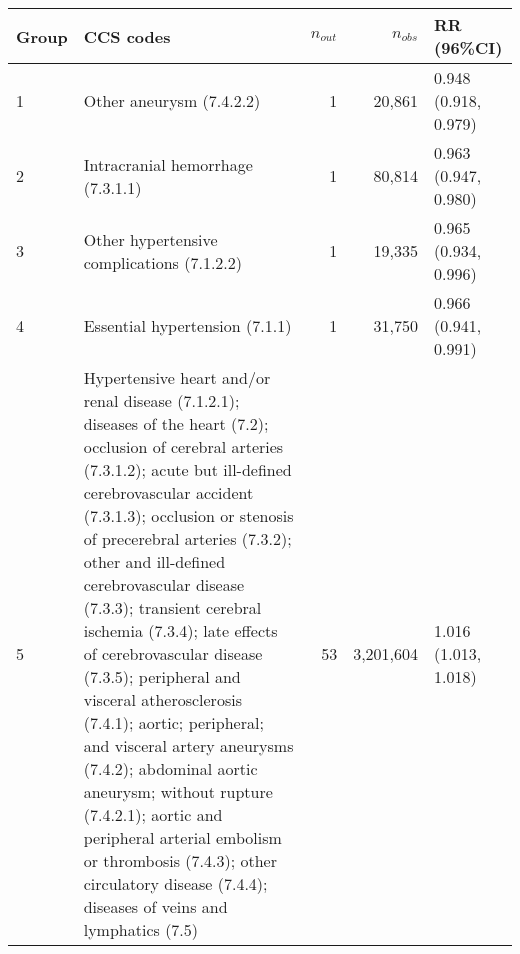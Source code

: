 \begin{tabular}{lp{6.5cm}rrp{2.2cm}}
  \hline
Group & CCS codes & $n_{out}$ & $n_{obs}$ & RR (96\%CI) \\ 
  \hline
   1 & Other aneurysm (7.4.2.2) &    1 & 20,861 & 0.948 (0.918, 0.979) \\ 
     2 & Intracranial hemorrhage (7.3.1.1) &    1 & 80,814 & 0.963 (0.947, 0.980) \\ 
     3 & Other hypertensive complications (7.1.2.2) &    1 & 19,335 & 0.965 (0.934, 0.996) \\ 
     4 & Essential hypertension (7.1.1) &    1 & 31,750 & 0.966 (0.941, 0.991) \\ 
     5 & Hypertensive heart and/or renal disease (7.1.2.1); diseases of the heart (7.2); occlusion of cerebral arteries (7.3.1.2); acute but ill-defined cerebrovascular accident (7.3.1.3); occlusion or stenosis of precerebral arteries (7.3.2); other and ill-defined cerebrovascular disease (7.3.3); transient cerebral ischemia (7.3.4); late effects of cerebrovascular disease (7.3.5); peripheral and visceral atherosclerosis (7.4.1); aortic; peripheral; and visceral artery aneurysms (7.4.2); abdominal aortic aneurysm; without rupture (7.4.2.1); aortic and peripheral arterial embolism or thrombosis (7.4.3); other circulatory disease (7.4.4); diseases of veins and lymphatics (7.5) &   53 & 3,201,604 & 1.016 (1.013, 1.018) \\ 
   \hline
\end{tabular}


